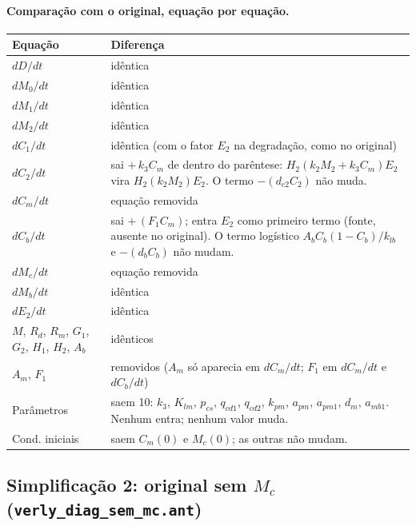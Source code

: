 \documentclass[11pt]{article}
\begin{document}
\paragraph{Comparação com o original, equação por equação.}

\begin{longtable}{p{2.2cm}p{12.3cm}}
\toprule
Equação & Diferença \\
\midrule
\endhead
$dD/dt$   & idêntica \\
$dM_0/dt$ & idêntica \\
$dM_1/dt$ & idêntica \\
$dM_2/dt$ & idêntica \\
$dC_1/dt$ & idêntica (com o fator $E_2$ na degradação, como no original) \\
$dC_2/dt$ & sai $+\,k_3 C_m$ de dentro do parêntese: $H_2 (k_2 M_2 + k_3 C_m) E_2$ vira
            $H_2 (k_2 M_2) E_2$. O termo $-(d_{c2} C_2)$ não muda. \\
$dC_m/dt$ & equação removida \\
$dC_b/dt$ & sai $+\,(F_1 C_m)$; entra $E_2$ como primeiro termo (fonte, ausente no
            original). O termo logístico $A_b C_b (1 - C_b)/k_{lb}$ e $-(d_b C_b)$ não mudam. \\
$dM_c/dt$ & equação removida \\
$dM_b/dt$ & idêntica \\
$dE_2/dt$ & idêntica \\
\midrule
$M$, $R_d$, $R_m$, $G_1$, $G_2$, $H_1$, $H_2$, $A_b$ & idênticos \\
$A_m$, $F_1$ & removidos ($A_m$ só aparecia em $dC_m/dt$; $F_1$ em $dC_m/dt$ e $dC_b/dt$) \\
Parâmetros & saem 10: $k_3$, $K_{lm}$, $p_{cs}$, $q_{cd1}$, $q_{cd2}$, $k_{pm}$, $a_{pm}$,
             $a_{pm1}$, $d_m$, $a_{mb1}$. Nenhum entra; nenhum valor muda. \\
Cond. iniciais & saem $C_m(0)$ e $M_c(0)$; as outras não mudam. \\
\bottomrule
\end{longtable}

\subsection{Simplificação 2: original sem $M_c$ (\texttt{verly\_diag\_sem\_mc.ant})}
\end{document}
